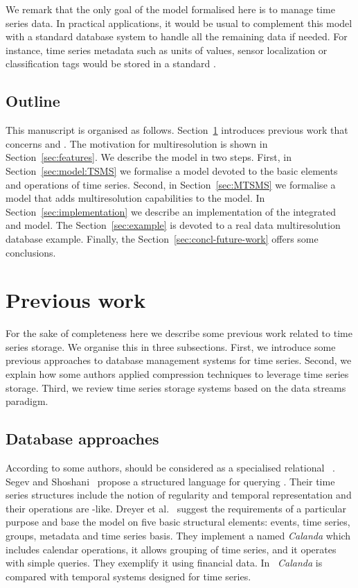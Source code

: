 We remark that the only goal of the model formalised here is to manage
time series data. In practical applications, it would be usual to
complement this model with a standard database system to handle all
the remaining data if needed. For instance, time series metadata such
as units of values, sensor localization or classification tags would
be stored in a standard .


\subsection{Outline}

This manuscript is organised as
follows. Section~\ref{sec:related-work} introduces previous work that
concerns  and .  The motivation for
multiresolution is shown in Section~\ref{sec:features}.  We describe
the model in two steps.  First, in Section~\ref{sec:model:TSMS} we
formalise a  model devoted to the basic elements and
operations of time series.  Second, in Section~\ref{sec:MTSMS} we
formalise a  model that adds multiresolution capabilities
to the  model.  In Section~\ref{sec:implementation} we
describe an implementation of the integrated  and
 model. The Section~\ref{sec:example} is devoted to a real
data multiresolution database example.  Finally,
the Section~\ref{sec:concl-future-work} offers some conclusions.


\section{Previous work}
\label{sec:related-work}

For the sake of completeness here we describe some previous work
related to time series storage. We organise this in three
subsections. First, we introduce some previous approaches to database
management systems for time series. Second, we explain how some
authors applied compression techniques to leverage time series
storage. Third, we review time series storage systems based on the
data streams paradigm.


\subsection{Database approaches}

According to some authors,  should be considered as a
specialised relational ~\cite{last01}.  Segev and
Shoshani~\cite{segev87:sigmod} propose a structured language for
querying . Their time series structures include the notion
of regularity and temporal representation and their operations are
-like.  Dreyer et al.~\cite{dreyer94} suggest the
requirements of a particular purpose  and base the model on
five basic structural elements: events, time series, groups, metadata
and time series basis. They implement a  named
\emph{Calanda} which includes calendar operations, it allows grouping
of time series, and it operates with simple queries. They exemplify it
using financial data. In~\cite{schmidt95} \emph{Calanda} is compared
with temporal systems designed for time series.
 

